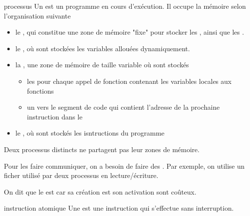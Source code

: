 

\begin{adjustwidth}{-3cm}{-3cm}


\begin{definition}{8.1}{processus}
    Un  est un programme en cours d'exécution. Il occupe la mémoire selon l'organisation suivante~
    \begin{itemize}
        \item le , qui constitue une zone de mémoire "fixe" pour stocker les , ainsi que les .
        \item le , où sont stockées les variables allouées dynamiquement.
        \item la , une zone de mémoire de taille variable où sont stockés 
        \begin{itemize}
            \item les  pour chaque appel de fonction contenant les variables locales aux fonctions
            \item un  vers le segment de code qui contient l'adresse de la prochaine instruction dans le 
        \end{itemize}
        \item le , où sont stockés les isntructions du programme
    \end{itemize}
\end{definition}

\begin{remarque}{8.2}{}
    Deux processus distincts ne partagent pas leur zones de mémoire.
\end{remarque}

\begin{remarque}{8.3}{}
    Pour les faire communiquer, on a besoin de faire des . Par exemple, on utilise un ficher utilisé par deux processus en lecture/écriture.
\end{remarque}

\begin{remarque}{8.4}{}
    On dit que le  est  car sa création est son activation sont coûteux.
\end{remarque}

\begin{definition}{8.5}{instruction atomique}
    Une  est une instruction qui s'effectue sans interruption.
\end{definition}


\end{adjustwidth}

